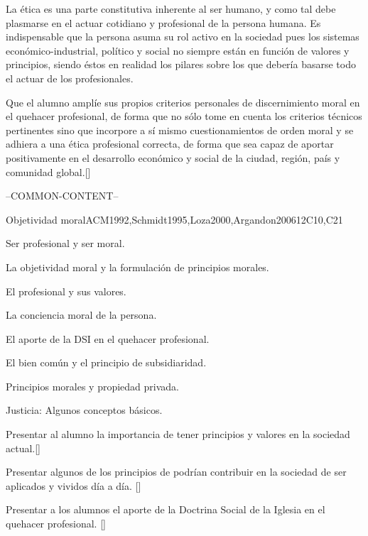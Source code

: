\begin{syllabus}


\begin{justification}
La ética es una parte constitutiva inherente al ser humano, y como tal debe plasmarse en el actuar cotidiano y profesional de la persona humana. Es indispensable que la persona asuma su rol activo en la sociedad pues los sistemas económico-industrial, político y social no siempre están en función de valores y principios, siendo éstos en realidad los pilares sobre los que debería basarse todo el actuar de los profesionales.
\end{justification}

\begin{goals}
\item Que el alumno amplíe sus propios criterios personales de discernimiento moral en el quehacer profesional, de forma que no sólo tome en cuenta los criterios técnicos pertinentes sino que incorpore a sí­ mismo cuestionamientos de orden moral y se adhiera a una ética profesional correcta, de forma que sea capaz de aportar positivamente en el desarrollo económico y social de la ciudad, región, país y comunidad global.[\Usage]
\end{goals}

--COMMON-CONTENT--

\begin{unit}{Objetividad moral}{}{ACM1992,Schmidt1995,Loza2000,Argandon2006}{12}{C10,C21}
\begin{topics}
	\item Ser profesional y ser moral.
	\item La objetividad moral y la formulación de principios morales.
	\item El profesional y sus valores.
	\item La conciencia moral de la persona.
	\item El aporte de la DSI en el quehacer profesional.
	\item El bien común y el principio de subsidiaridad.
	\item Principios morales y propiedad privada.
	\item Justicia: Algunos conceptos básicos.
\end{topics}
\begin{learningoutcomes}
	\item Presentar al alumno la importancia de tener principios y valores en la sociedad actual.[\Usage]
	\item Presentar algunos de los principios de podrían contribuir en la sociedad de ser aplicados y vividos día a día. [\Usage]
	\item Presentar a los alumnos el aporte de la Doctrina Social de la Iglesia en el quehacer profesional. [\Usage]
\end{learningoutcomes}
\end{unit}


\end{syllabus}
